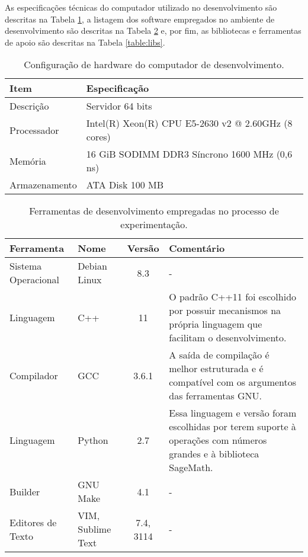 As especificações técnicas do computador utilizado no desenvolvimento são descritas na Tabela \ref{table:config}, a listagem dos software empregados no ambiente de desenvolvimento são descritas na Tabela \ref{table:tools} e, por fim, as bibliotecas e ferramentas de apoio são descritas na Tabela \ref{table:libs}.

\begin{table}[!ht]
\centering
\caption{Configuração de hardware do computador de desenvolvimento.}
\begin{tabular}{ll}
\toprule
\textbf{Item}        & \textbf{Especificação}                               \\ \midrule
Descrição            & Servidor 64 bits                                     \\
\rowcolor[gray]{0.9}
Processador          & Intel(R) Xeon(R) CPU E5-2630 v2 @ 2.60GHz (8 cores)  \\
Memória              & 16 GiB SODIMM DDR3 Síncrono 1600 MHz (0,6 ns)        \\
\rowcolor[gray]{0.9}
Armazenamento        & ATA Disk 100 MB                                      \\
\bottomrule
\end{tabular}
\label{table:config}
\end{table}

%
%
\begin{table}[!ht]
\centering
\caption{Ferramentas de desenvolvimento empregadas no processo de experimentação.}
    \begin{tabularx}{0.95\textwidth}{llcX}
    \toprule
        \textbf{Ferramenta} & {\textbf{Nome}} & \textbf{Versão} & \textbf{Comentário}  \\
    \midrule
        Sistema Operacional  & Debian Linux      & 8.3       & -                                                            \\
        \rowcolor[gray]{0.9}
        Linguagem            & C++               & 11        & O padrão C++11 foi escolhido por possuir mecanismos na própria linguagem que facilitam o desenvolvimento. \\
        Compilador           & GCC               & 3.6.1     & A saída de compilação é melhor estruturada e é compatível com os argumentos das ferramentas GNU.          \\
        \rowcolor[gray]{0.9}
        Linguagem            & Python            & 2.7       & Essa linguagem e versão foram escolhidas por terem suporte à operações com números grandes e à biblioteca SageMath. \\
        Builder              & GNU Make          & 4.1       & -                                                                                                         \\
        \rowcolor[gray]{0.9}
        Editores de Texto    & VIM, Sublime Text & 7.4, 3114 & -                                                            \\
    \bottomrule

    \end{tabularx}
\label{table:tools}

\end{table}

